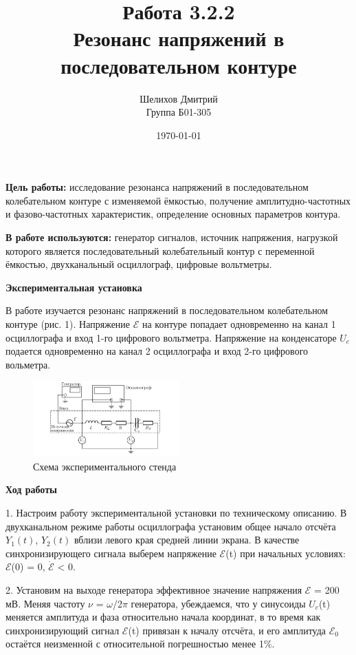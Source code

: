 \documentclass[a4paper,12pt]{article}
\author{Шелихов Дмитрий\\Группа Б01-305}
\title{\textbf{Работа 3.2.2\\Резонанс напряжений в последовательном контуре}}
\date{\today}
\begin{document}
 

\maketitle

\textbf{Цель работы:} исследование резонанса напряжений в последовательном колебательном контуре с изменяемой ёмкостью, получение амплитудно-частотных и фазово-частотных характеристик, определение основных параметров контура.

\textbf{В работе используются:} генератор сигналов, источник напряжения, нагрузкой которого является последовательный колебательный контур с переменной ёмкостью, двухканальный осциллограф, цифровые вольтметры.

\noindent\textbf{Экспериментальная установка}

В работе изучается резонанс напряжений в последовательном колебательном контуре (рис. 1). Напряжение $\mathcal{E}$ на контуре попадает одновременно на канал 1 осциллографа и вход 1-го цифрового вольтметра. Напряжение на конденсаторе $U_c$ подается одновременно на канал 2 осциллографа и вход 2-го цифрового вольметра.

\begin{figure}
\begin{center}
\includegraphics[width = 0.5\textwidth]{1.png}
\caption{Схема экспериментального стенда}
\end{center}
\end{figure}


\noindent\textbf{Ход работы} 

1. Настроим работу экспериментальной установки по техническому описанию. В двухканальном режиме работы осциллографа установим общее начало отсчёта $Y_1(t)$, $Y_2(t)$ вблизи левого края средней линии экрана. В качестве синхронизирующего сигнала выберем напряжение $\mathcal{E}$(t) при начальных условиях: $\mathcal{E}$(0) = 0, $\dot{\mathcal{E}}$ < 0.

2. Установим на выходе генератора эффективное значение напряжения $\mathcal{E}$ = 200 мВ. Меняя частоту $\nu$ = $\omega$/2$\pi$ генератора, убеждаемся, что у синусоиды $U_c$(t) меняется амплитуда и фаза относительно начала координат, в то время как синхронизирующий сигнал $\mathcal{E}$(t) привязан к началу отсчёта, и его амплитуда $\mathcal{E}_0$ остаётся неизменной с относительной погрешностью менее 1\%. 
\end{document}

